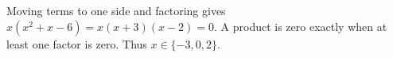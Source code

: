 Moving terms to one side and factoring gives $x(x^2+x-6)=x(x+3)(x-2)=0$. A product is zero exactly when at least one factor is zero. Thus $\boxed{x\in\{-3,0,2\}}$.
